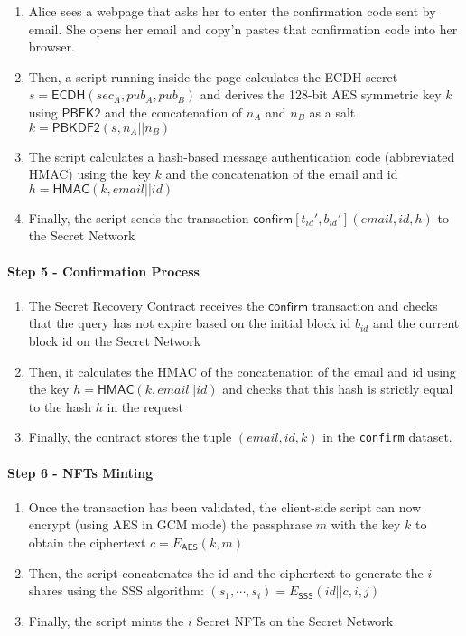 \documentclass[12pt]{article}
\newcommand{\ms}[1]{\ensuremath{\mathsf{#1}}}
\newcommand{\tx}[3]{\ms{#1}[#2](#3)}
\begin{document}
\begin{enumerate}
\begin{enumerate}[label=4.\arabic*]
  \item Alice sees a webpage that asks her to enter the confirmation code sent by email. She opens her email and copy'n pastes that confirmation code into her browser. 
  \item Then, a script running inside the page calculates the ECDH secret $s=\ms{ECDH}(sec_A, pub_A, pub_B)$ and derives the 128-bit AES symmetric key $k$ using $\ms{PBFK2}$ and the concatenation of $n_A$ and $n_B$ as a salt $k=\ms{PBKDF2}(s, n_A || n_B)$
  \item The script calculates a hash-based message authentication code (abbreviated HMAC) using the key $k$ and the concatenation of the email and id $h=\ms{HMAC}(k, email || id)$
  \item Finally, the script sends the transaction $\tx{confirm}{t_{id}', b_{id}'}{email, id, h}$ to the Secret Network
\end{enumerate}

\paragraph{Step 5 - Confirmation Process}

\begin{enumerate}[label=5.\arabic*]
  \item The Secret Recovery Contract receives the $\ms{confirm}$ transaction and checks that the query has not expire based on the initial block id $b_{id}$ and the current block id on the Secret Network
  \item Then, it calculates the HMAC of the concatenation of the email and id using the key $h=\ms{HMAC}(k, email || id)$ and checks that this hash is strictly equal to the hash $h$ in the request
  \item Finally, the contract stores the tuple $(email, id, k)$ in the {\tt confirm} dataset.
\end{enumerate}

\paragraph{Step 6 - NFTs Minting}

\begin{enumerate}[label=6.\arabic*]
  \item Once the transaction has been validated, the client-side script can now encrypt (using AES in GCM mode) the passphrase $m$ with the key $k$ to obtain the ciphertext $c=E_{\ms{AES}}(k, m)$
  \item Then, the script concatenates the id and the ciphertext to generate the $i$ shares using the SSS algorithm: $(s_1,\cdots,s_i)=E_{\ms{SSS}}(id||c, i, j)$
  \item Finally, the script mints the $i$ Secret NFTs on the Secret Network
\end{enumerate}


\end{enumerate}
\end{document}
